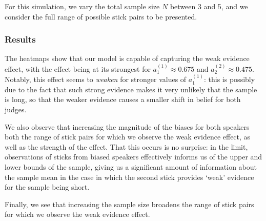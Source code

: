 \documentclass[10pt,letterpaper]{article}
\begin{document}
For this simulation, we vary the total sample size $N$ between 3 and 5, and we consider the full range of possible stick pairs to
be presented.

\subsubsection{Results}
The heatmaps show that our model is capable of capturing the weak evidence effect, with the effect being at its 
strongest for $a_1^{(1)} \approx 0.675$ and $a_2^{(2)} \approx 0.475$. Notably, this effect seems to \textit{weaken} for
stronger values of $a_1^{(1)}$: this is possibly due to the fact that such strong evidence makes it very unlikely that
the sample is long, so that the weaker evidence causes a smaller shift in belief for both judges.

We also observe that increasing the magnitude of the biases for both speakers both the range 
of stick pairs for which we observe the weak evidence effect, as well as the strength of the effect. That this occurs is
no surprise: in the limit, observations of sticks from biased speakers effectively informs us of the upper and lower bounds
of the sample, giving us a significant amount of information about the sample mean in the case in which the second stick
provides `weak' evidence for the sample being short.

Finally, we see that increasing the sample size broadens the range of stick pairs for which we observe the weak evidence
effect.
\end{document}
